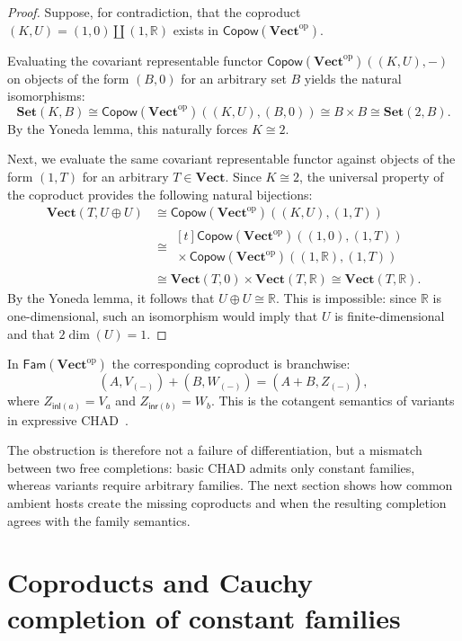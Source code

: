 \documentclass[runningheads,envcountsame]{llncs}
\newcommand{\Set}{\mathbf{Set}}
\newcommand{\Vect}{\mathbf{Vect}}
\newcommand{\Vectop}{\mathbf{Vect}^{\mathrm{op}}}
\newcommand{\Copow}{\mathsf{Copow}}
\newcommand{\Fam}{\mathsf{Fam}}
\begin{document}
\begin{proof}
	Suppose, for contradiction, that the coproduct $(K,U) = (1,0) \amalg (1,\mathbb{R})$ exists in $\Copow(\Vectop)$.
	
	Evaluating the covariant representable functor $\Copow(\Vectop)((K,U), -)$ on objects of the form $(B,0)$ for an arbitrary set $B$ yields the natural isomorphisms:
	$$
	\Set(K, B) \cong \Copow(\Vectop)((K,U),(B,0)) \cong B \times B \cong \Set(2, B).
	$$
	By the Yoneda lemma, this naturally forces $K \cong 2$.
	
	Next, we evaluate the same covariant representable functor against objects of the form $(1,T)$ for an arbitrary $T \in \Vect$. Since $K \cong 2$, the universal property of the coproduct provides the following natural bijections:
	$$
	\begin{aligned}
		\Vect(T,U\oplus U)
		&\cong \Copow(\Vectop)((K,U),(1,T)) \\
		&\cong
		\begin{multlined}[t]
		\Copow(\Vectop)((1,0),(1,T))\\
		{}\times\Copow(\Vectop)((1,\mathbb R),(1,T))
		\end{multlined}\\
		&\cong \Vect(T,0)\times\Vect(T,\mathbb R)
		\cong \Vect(T,\mathbb R).
	\end{aligned}
	$$
By the Yoneda lemma, it follows that $U \oplus U \cong \mathbb{R}$. This is impossible: since $\mathbb{R}$ is one-dimensional, such an isomorphism would imply that $U$ is finite-dimensional and that $2\dim(U)=1$.
\end{proof}

In $\Fam(\Vectop)$ the corresponding coproduct is branchwise:
$$
(A,V_{(-)})+(B,W_{(-)})=(A+B,Z_{(-)}),
$$
where $Z_{\mathsf{inl}(a)}=V_a$ and $Z_{\mathsf{inr}(b)}=W_b$. This is the cotangent semantics of variants in expressive CHAD~\cite{LucatelliNunesVakar2023}.

The obstruction is therefore not a failure of differentiation, but a mismatch between two free completions: basic CHAD admits only constant families, whereas variants require arbitrary families. The next section shows how common ambient hosts create the missing coproducts and when the resulting completion agrees with the family semantics.

\section{Coproducts and Cauchy completion of constant families}
\label{sec:completion}
\end{document}
